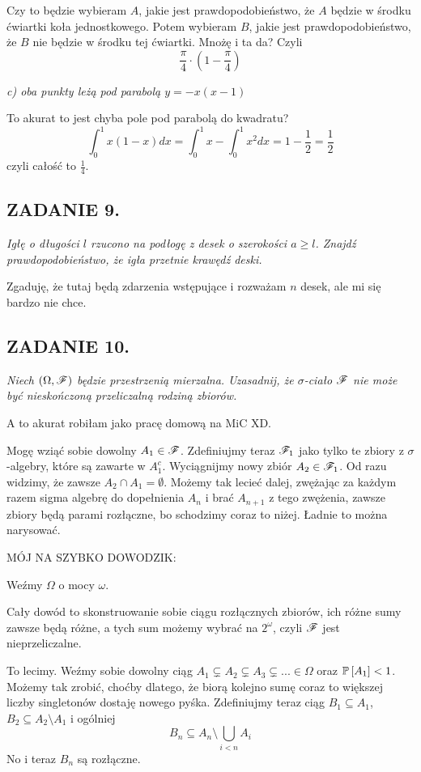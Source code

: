\documentclass{article}
\begin{document}
Czy to będzie wybieram $A$, jakie jest prawdopodobieństwo, że $A$ będzie w środku ćwiartki koła jednostkowego. Potem wybieram $B$, jakie jest prawdopodobieństwo, że $B$ nie będzie w środku tej ćwiartki. Mnożę i ta da? Czyli
$$\frac\pi4\cdot(1-\frac\pi4)$$

\indent \emph{\color{blue}c) oba punkty leżą pod parabolą $y=-x(x-1)$}
\smallskip

To akurat to jest chyba pole pod parabolą do kwadratu?
$$\int_0^1x(1-x)dx=\int_0^1x-\int_0^1x^2dx=1-\frac12=\frac12$$
czyli całość to $\frac14$.

\subsection*{ZADANIE 9.}
\emph{Igłę o długości $l$ rzucono na podłogę z desek o szerokości $a\geq l$. Znajdź prawdopodobieństwo, że igła przetnie krawędź deski.}
\smallskip

Zgaduję, że tutaj będą zdarzenia wstępujące i rozważam $n$ desek, ale mi się bardzo nie chce.

\subsection*{ZADANIE 10.}
\emph{Niech $(\Omega,\mathcal{F})$ będzie przestrzenią mierzalna. Uzasadnij, że $\sigma$-ciało $\mathcal{F}$ nie może być nieskończoną przeliczalną rodziną zbiorów.}
\smallskip

A to akurat robiłam jako pracę domową na MiC XD.
\smallskip

Mogę wziąć sobie dowolny $A_1\in \mathcal{F}$. Zdefiniujmy teraz $\mathcal{F}_1$ jako tylko te zbiory z $\sigma$-algebry, które są zawarte w $A_1^c$. Wyciągnijmy nowy zbiór $A_2\in\mathcal{F}_1$. Od razu widzimy, że zawsze $A_2\cap A_1=\emptyset$. Możemy tak lecieć dalej, zwężając za każdym razem sigma algebrę do dopełnienia $A_n$ i brać $A_{n+1}$ z tego zwężenia, zawsze zbiory będą parami rozłączne, bo schodzimy coraz to niżej. Ładnie to można narysować.
\smallskip

MÓJ NA SZYBKO DOWODZIK:

Weźmy $\Omega$ o mocy $\omega$.

Cały dowód to skonstruowanie sobie ciągu rozłącznych zbiorów, ich różne sumy zawsze będą różne, a tych sum możemy wybrać na $2^\omega$, czyli $\mathcal{F}$ jest nieprzeliczalne.

To lecimy. Weźmy sobie dowolny ciąg $A_1\subsetneq A_2\subsetneq A_3\subsetneq...\in\Omega$ oraz $\mathbb{P}\left[A_1\right]<1$. Możemy tak zrobić, choćby dlatego, że biorą kolejno sumę coraz to większej liczby singletonów dostaję nowego pyśka. Zdefiniujmy teraz ciąg $B_1\subseteq A_1$, $B_2\subseteq A_2\setminus A_1$ i ogólniej
$$B_n\subseteq A_n\setminus\bigcup\limits_{i< n} A_{i}$$
No i teraz $B_n$ są rozłączne.
\end{document}
